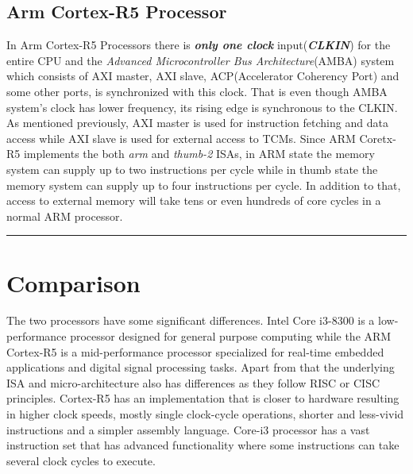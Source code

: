 \documentclass[a4paper,11pt]{article}
\begin{document}
\subsection{Arm Cortex-R5 Processor}
In Arm Cortex-R5 Processors there is \textbf{\textit{only one clock}} input(\textbf{\textit{CLKIN}}) for the entire CPU and the \textit{Advanced Microcontroller Bus Architecture}(AMBA) system which consists of AXI master, AXI slave, ACP(Accelerator Coherency Port) and some other ports, is synchronized with this clock. That is even though AMBA system's clock has lower frequency, its rising edge is synchronous to the CLKIN. As mentioned previously, AXI master is used for instruction fetching and data access while AXI slave is used for external access to TCMs. Since ARM Coretx-R5 implements the both \textit{arm} and \textit{thumb-2} ISAs, in ARM state the memory system can supply up to two instructions per cycle while in thumb state the memory system can supply up to four instructions per cycle. In addition to that, access to external memory will take tens or even hundreds of core cycles in a normal ARM processor.




\vspace{1cm}\hrule

\section{Comparison}

The two processors have some significant differences. Intel Core i3-8300 is a low-performance processor designed for general purpose computing while the ARM Cortex-R5 is a mid-performance processor specialized for real-time embedded applications and digital signal processing tasks. Apart from that the underlying ISA and micro-architecture also has differences as they follow RISC or CISC principles. Cortex-R5 has an implementation that is closer to hardware resulting in higher clock speeds, mostly single clock-cycle operations, shorter and less-vivid instructions and a simpler assembly language. Core-i3 processor has a vast instruction set that has advanced functionality where some instructions can take several clock cycles to execute.\\
\end{document}
